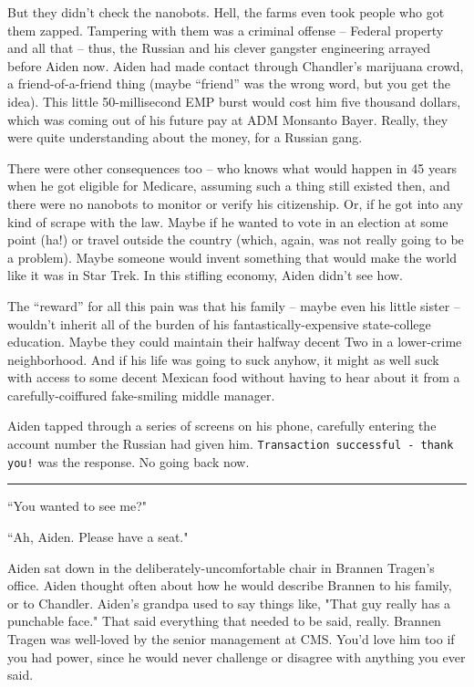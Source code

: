 \documentclass[11pt]{book}
\begin{document}
	But they didn't check the nanobots. Hell, the farms even took people who got them zapped. Tampering with them was a criminal offense -- Federal property and all that -- thus, the Russian and his clever gangster engineering arrayed before Aiden now. Aiden had made contact through Chandler's marijuana crowd, a friend-of-a-friend thing (maybe ``friend'' was the wrong word, but you get the idea). This little 50-millisecond EMP burst would cost him five thousand dollars, which was coming out of his future pay at ADM Monsanto Bayer. Really, they were quite understanding about the money, for a Russian gang. 
	
	There were other consequences too -- who knows what would happen in 45 years when he got eligible for Medicare, assuming such a thing still existed then, and there were no nanobots to monitor or verify his citizenship. Or, if he got into any kind of scrape with the law. Maybe if he wanted to vote in an election at some point (ha!) or travel outside the country (which, again, was not really going to be a problem). Maybe someone would invent something that would make the world like it was in Star Trek. In this stifling economy, Aiden didn't see how. 
	
	The ``reward'' for all this pain was that his family -- maybe even his little sister -- wouldn't inherit all of the burden of his fantastically-expensive state-college education. Maybe they could maintain their halfway decent Two in a lower-crime neighborhood. And if his life was going to suck anyhow, it might as well suck with access to some decent Mexican food without having to hear about it from a carefully-coiffured fake-smiling middle manager.
	
	Aiden tapped through a series of screens on his phone, carefully entering the account number the Russian had given him. \texttt{Transaction successful - thank you!} was the response. No going back now.
	
	\vspace{0.5cm}
	\hrule
	\vspace{0.5cm}
	
	``You wanted to see me?"
	
	``Ah, Aiden. Please have a seat."
	
	Aiden sat down in the deliberately-uncomfortable chair in Brannen Tragen's office. Aiden thought often about how he would describe Brannen to his family, or to Chandler. Aiden's grandpa used to say things like, "That guy really has a punchable face." That said everything that needed to be said, really. Brannen Tragen was well-loved by the senior management at CMS. You'd love him too if you had power, since he would never challenge or disagree with anything you ever said.
	
\end{document}
